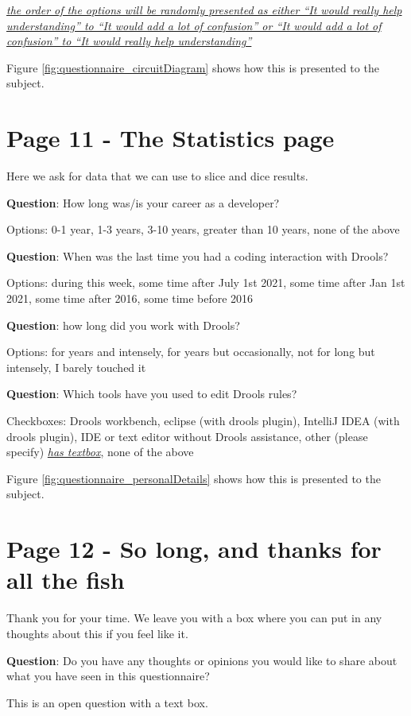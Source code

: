 \emph{\underline{the order of the options will be randomly presented as either ``It would really help understanding'' to ``It would add a lot of confusion'' or ``It would add a lot of confusion'' to ``It would really help understanding''}}

Figure \ref{fig:questionnaire_circuitDiagram} shows how this is presented to the subject.

\section{Page 11 - The Statistics page}
Here we ask for data that we can use to slice and dice results.

\textbf{Question}: How long was/is your career as a developer?

Options: 0-1 year, 1-3 years, 3-10 years, greater than 10 years, none of the above

\textbf{Question}: When was the last time you had a coding interaction with Drools?

Options: during this week, some time after July 1st 2021, some time after Jan 1st 2021, some time after 2016, some time before 2016

\textbf{Question}: how long did you work with Drools?

Options: for years and intensely, for years but occasionally, not for long but intensely, I barely touched it


\textbf{Question}: Which tools have you used to edit Drools rules?

Checkboxes: Drools workbench, eclipse (with drools plugin), IntelliJ IDEA (with drools plugin), IDE or text editor without Drools assistance, other (please specify) \emph{\underline{has textbox}}, none of the above

Figure \ref{fig:questionnaire_personalDetails} shows how this is presented to the subject.

\section{Page 12 - So long, and thanks for all the fish}
Thank you for your time.
We leave you with a box where you can put in any thoughts about this if you feel like it.

\textbf{Question}: Do you have any thoughts or opinions you would like to share about what you have seen in this questionnaire?

This is an open question with a text box.

